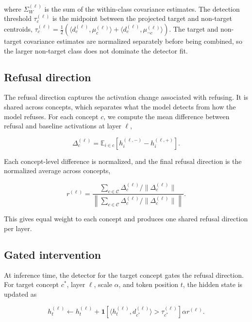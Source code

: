 \documentclass{article}
\begin{document}
where $\Sigma_W^{(\ell)}$ is the sum of the within-class covariance estimates.
The detection threshold $\tau_c^{(\ell)}$ is the midpoint between the projected target and
non-target centroids, $ \tau_c^{(\ell)} = \frac{1}{2} \left(\langle d_c^{(\ell)}, \mu_c^{(\ell)} \rangle + \langle d_c^{(\ell)}, \mu_{\neg c}^{(\ell)} \rangle\right)$. The target and non-target covariance estimates are
normalized separately before being combined, so the larger non-target class does
not dominate the detector fit.

\subsection{Refusal direction}

The refusal direction captures the activation change associated with refusing.
It is shared across concepts, which separates what the model detects from how
the model refuses. For each concept $c$, we compute the mean difference between
refusal and baseline activations at layer $\ell$,

\begin{equation}
    \Delta_c^{(\ell)}
    =
    \mathbb{E}_{i \in c}
    \left[
    h_i^{(\ell,-)} - h_i^{(\ell,+)}
    \right].
\end{equation}

Each concept-level difference is normalized, and the final refusal direction is
the normalized average across concepts,

\begin{equation}
    r^{(\ell)}
    =
    \frac{
    \sum_{c \in \mathcal{C}}
    \Delta_c^{(\ell)} / \|\Delta_c^{(\ell)}\|
    }{
    \left\|
    \sum_{c \in \mathcal{C}}
    \Delta_c^{(\ell)} / \|\Delta_c^{(\ell)}\|
    \right\|
    }.
\end{equation}

This gives equal weight to each concept and produces one shared refusal
direction per layer.

\subsection{Gated intervention}

At inference time, the detector for the target concept gates the refusal
direction. For target concept $c^\ast$, layer $\ell$, scale $\alpha$, and token
position $t$, the hidden state is updated as

\begin{equation}
    h_t^{(\ell)}
    \leftarrow
    h_t^{(\ell)}
    +
    \mathbf{1}
    \left[
    \langle h_t^{(\ell)}, d_{c^\ast}^{(\ell)} \rangle
    >
    \tau_{c^\ast}^{(\ell)}
    \right]
    \alpha r^{(\ell)} .
\end{equation}
\end{document}
